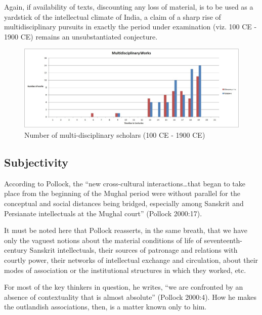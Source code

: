 Again, if availability of texts, discounting any loss of material, is to be used as a yardstick of the intellectual climate of India, a claim of a sharp rise of multidisciplinary pursuits in exactly the period under examination (viz. 100 CE - 1900 CE) remains an unsubstantiated conjecture.

\newpage

\begin{figure}[ht]
\centering
\includegraphics[scale=.9]{figures/fig2.jpg}
\caption{Number of multi-disciplinary scholars (100 CE - 1900 CE)}\label{chap2-fig2}
\end{figure}

\subsection{Subjectivity}%

According to Pollock, the “new cross-cultural interactions…that began to take place from the beginning of the Mughal period were without parallel for the conceptual and social distances being bridged, especially among Sanskrit and Persianate intellectuals at the Mughal court” (Pollock 2000:17). 

It must be noted here that Pollock reasserts, in the same breath, that we have only the vaguest notions about the material conditions of life of seventeenth-century Sanskrit intellectuals, their sources of patronage and relations with courtly power, their networks of intellectual exchange and circulation, about their modes of association or the institutional structures in which they worked, etc. 

For most of the key thinkers in question, he writes, “we are confronted by an absence of contextuality that is almost absolute” (Pollock 2000:4). How he makes the outlandish associations, then, is a matter known only to him. 

